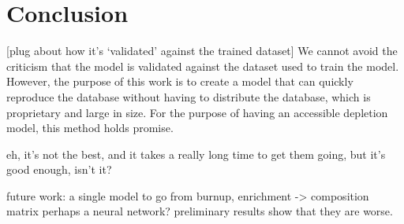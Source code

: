 \section{Conclusion}

[plug about how it's `validated' against the trained dataset]
We cannot avoid the criticism that the model is validated
against the dataset used to train the model. However, the purpose
of this work is to create a model that can quickly reproduce the
database without having to distribute the database, which is proprietary
and large in size. For the purpose of having an accessible
depletion model, this method holds promise.


eh, it's not the best, and it takes a really long time to get them going,
but it's good enough, isn't it?

future work:
a single model to go from
burnup, enrichment -> composition matrix
perhaps a neural network? preliminary results
show that they are worse. 